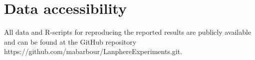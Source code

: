 \documentclass[11pt]{article}
\begin{document}
\section*{Data accessibility}
All data and R-scripts for reproducing the reported results are publicly available and can be found at the GitHub repository https://github.com/mabarbour/Lanphere\textunderscore Experiments.git.

\newpage{}










\end{document}

